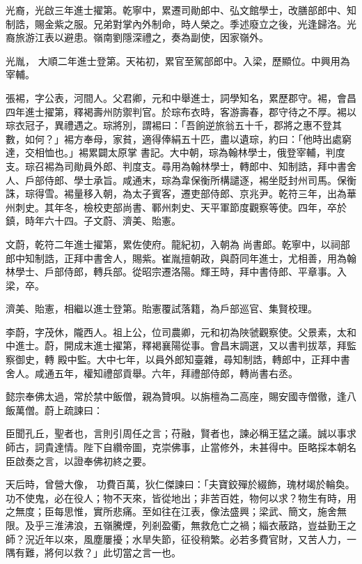 \begin{pinyinscope}
 光裔，光啟三年進士擢第。乾寧中，累遷司勛郎中、弘文館學士，改膳部郎中、知制誥，賜金紫之服。兄弟對掌內外制命，時人榮之。季述廢立之後，光逢歸洛。光裔旅游江表以避患。嶺南劉隱深禮之，奏為副使，因家嶺外。



 光胤，
 大順二年進士登第。天祐初，累官至駕部郎中。入梁，歷顯位。中興用為宰輔。



 張裼，字公表，河間人。父君卿，元和中舉進士，詞學知名，累歷郡守。裼，會昌四年進士擢第，釋褐壽州防禦判官。於琮布衣時，客游壽春，郡守待之不厚。裼以琮衣冠子，異禮遇之。琮將別，謂裼曰：「吾餉逆旅翁五十千，郡將之惠不登其數，如何？」裼方奉母，家貧，適得俸絹五十匹，盡以遺琮，約曰：「他時出處窮達，交相恤也。」裼累闢太原掌
 書記。大中朝，琮為翰林學士，俄登宰輔，判度支。琮召裼為司勛員外郎、判度支。尋用為翰林學士，轉郎中、知制誥，拜中書舍人、戶部侍郎、學士承旨。咸通末，琮為韋保衡所構譴逐，裼坐貶封州司馬。保衡誅，琮得雪。裼量移入朝，為太子賓客，遷吏部侍郎、京兆尹。乾符三年，出為華州刺史。其年冬，檢校吏部尚書、鄆州刺史、天平軍節度觀察等使。四年，卒於鎮，時年六十四。子文蔚、濟美、貽憲。



 文蔚，乾符二年進士擢第，累佐使府。龍紀初，入朝為
 尚書郎。乾寧中，以祠部郎中知制誥，正拜中書舍人，賜紫。崔胤擅朝政，與蔚同年進士，尤相善，用為翰林學士、戶部侍郎，轉兵部。從昭宗遷洛陽。輝王時，拜中書侍郎、平章事。入梁，卒。



 濟美、貽憲，相繼以進士登第。貽憲覆試落籍，為戶部巡官、集賢校理。



 李蔚，字茂休，隴西人。祖上公，位司農卿，元和初為陜虢觀察使。父景素，太和中進士。蔚，開成末進士擢第，釋褐襄陽從事。會昌末調選，又以書判拔萃，拜監察御史，轉
 殿中監。大中七年，以員外郎知臺雜，尋知制誥，轉郎中，正拜中書舍人。咸通五年，權知禮部貢舉。六年，拜禮部侍郎，轉尚書右丞。



 懿宗奉佛太過，常於禁中飯僧，親為贊唄。以旃檀為二高座，賜安國寺僧徹，逢八飯萬僧。蔚上疏諫曰：



 臣聞孔丘，聖者也，言則引周任之言；苻融，賢者也，諫必稱王猛之議。誠以事求師古，詞貴達情。陛下自纘帝圖，克崇佛事，止當修外，未甚得中。臣略採本朝名臣啟奏之言，以證奉佛初終之要。



 天后時，曾營大像，
 功費百萬，狄仁傑諫曰：「夫寶鉸殫於綴飾，瑰材竭於輪奐。功不使鬼，必在役人；物不天來，皆從地出；非苦百姓，物何以求？物生有時，用之無度；臣每思惟，實所悲痛。至如往在江表，像法盛興；梁武、簡文，施舍無限。及乎三淮沸浪，五嶺騰煙，列剎盈衢，無救危亡之禍；緇衣蔽路，豈益勤王之師？況近年以來，風塵屢擾；水旱失節，征役稍繁。必若多費官財，又苦人力，一隅有難，將何以救？」此切當之言一也。




\end{pinyinscope}

